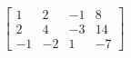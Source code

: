 \documentclass[preview]{standalone}
\begin{document}
\begin{align*}
\left[\begin{array}{ccc|c} 1 & 2 & -1 & 8 \\ 2 & 4 & -3 & 14 \\ -1 & -2 & 1 & -7 \end{array}\right]
\end{align*}
\end{document}

